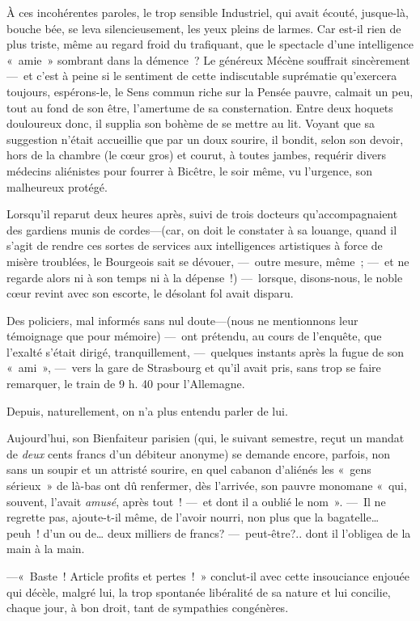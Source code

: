 \documentclass[french,twoside]{book} %
\begin{document}
   À ces incohérentes paroles, le trop sensible Industriel, qui avait écouté, jusque-là, bouche bée, se leva silencieusement, les yeux pleins de larmes. Car est-il rien de plus triste, même au regard froid du trafiquant, que le spectacle d’une intelligence « amie » sombrant dans la démence ? Le généreux Mécène souffrait sincèrement— et c’est à peine si le sentiment de cette indiscutable suprématie qu’exercera toujours, espérons-le, le Sens commun riche sur la Pensée pauvre, calmait un peu, tout au fond de son être, l’amertume de sa consternation. Entre deux hoquets douloureux donc, il supplia son bohème de se mettre au lit. Voyant que sa suggestion n’était accueillie que par un doux sourire, il bondit, selon son devoir, hors de la chambre (le cœur gros) et courut, à toutes jambes, requérir divers médecins aliénistes pour fourrer à Bicêtre, le soir même, vu l’urgence, son malheureux protégé.\par
Lorsqu’il reparut deux heures après, suivi de trois docteurs qu’accompagnaient des gardiens munis de cordes—(car, on doit le constater   à sa louange, quand il s’agit de rendre ces sortes de services aux intelligences artistiques à force de misère troublées, le Bourgeois sait se dévouer, — outre mesure, même ; — et ne regarde alors ni à son temps ni à la dépense !) — lorsque, disons-nous, le noble cœur revint avec son escorte, le désolant fol avait disparu.\par
Des policiers, mal informés sans nul doute—(nous ne mentionnons leur témoignage que pour mémoire) — ont prétendu, au cours de l’enquête, que l’exalté s’était dirigé, tranquillement, — quelques instants après la fugue de son « ami », — vers la gare de Strasbourg et qu’il avait pris, sans trop se faire remarquer, le train de 9 h. 40 pour l’Allemagne.\par
Depuis, naturellement, on n’a plus entendu parler de lui.\par
Aujourd’hui, son Bienfaiteur parisien (qui, le suivant semestre, reçut un mandat de \emph{deux} cents francs d’un débiteur anonyme) se demande   encore, parfois, non sans un soupir et un attristé sourire, en quel cabanon d’aliénés les « gens sérieux » de là-bas ont dû renfermer, dès l’arrivée, son pauvre monomane « qui, souvent, l’avait \emph{amusé}, après tout ! — et dont il a oublié le nom ». — Il ne regrette pas, ajoute-t-il même, de l’avoir nourri, non plus que la bagatelle… peuh ! d’un ou de… deux milliers de francs? — peut-être?.. dont il l’obligea de la main à la main.\par
—« Baste ! Article profits et pertes ! » conclut-il avec cette insouciance enjouée qui décèle, malgré lui, la trop spontanée libéralité de sa nature et lui concilie, chaque jour, à bon droit, tant de sympathies congénères.
\end{document}
